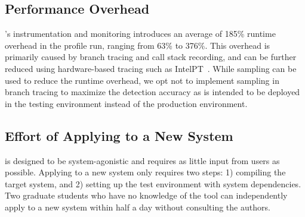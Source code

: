 \subsection{Performance Overhead}
\label{sec:eval:perf}

\tool's instrumentation and monitoring introduces an average of 185\% runtime overhead in the profile run, ranging from 63\% to 376\%. This overhead is primarily caused by branch tracing and call stack recording, 
and can be further reduced using hardware-based tracing such as IntelPT~\cite{henschelintelpt}. 
While sampling can be used to reduce the runtime overhead, we opt not to implement sampling in branch tracing to maximize the detection accuracy as \tool is intended to be deployed in the testing environment instead of the production environment.

\subsection{Effort of Applying \tool to a New System}

\tool is designed to be system-agonistic and requires as little input from users as possible. Applying \tool to a new system only requires two steps: 1) compiling the target system, and 2) setting up the test environment with system dependencies. Two graduate students who have no knowledge of the tool can independently apply \tool to a new system within half a day without consulting the authors. 